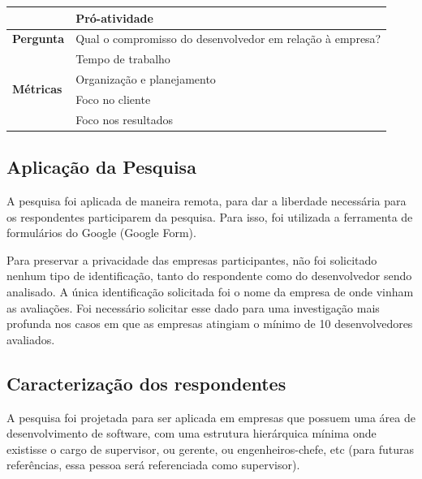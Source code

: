 \begin{table}[h]
\begin{tabular}{|p{2cm}|p{6.25cm}|p{6.25cm}|}
		& \multicolumn{2}{l|}{Pró-atividade}                                                                      \\ \hline\hline
		\textbf{Pergunta}                  & \multicolumn{2}{l|}{\parbox{12cm}{Qual o compromisso do desenvolvedor em relação à empresa?}}                          \\ \hline
		\multirow{4}{*}{\textbf{Métricas}} & \multicolumn{2}{l|}{Tempo de trabalho}                                                                  \\ \cline{2-3} 
		& \multicolumn{2}{l|}{Organização e planejamento}                                                         \\ \cline{2-3} 
		& \multicolumn{2}{l|}{Foco no cliente}                                                                    \\ \cline{2-3} 
		& \multicolumn{2}{l|}{Foco nos resultados}                                                                \\ \hline
	\end{tabular}
\end{table}

\subsection{Aplicação da Pesquisa}

A pesquisa foi aplicada de maneira remota, para dar a liberdade necessária para os respondentes participarem da pesquisa. Para isso, foi utilizada a ferramenta de formulários do Google (Google Form).

Para preservar a privacidade das empresas participantes, não foi solicitado nenhum tipo de identificação, tanto do respondente como do desenvolvedor sendo analisado. A única identificação solicitada foi o nome da empresa de onde vinham as avaliações. Foi necessário solicitar esse dado para uma investigação mais profunda nos casos em que as empresas atingiam o mínimo de 10 desenvolvedores avaliados.

\subsection{Caracterização dos respondentes}\label{caracterizacao_respondentes}

A pesquisa foi projetada para ser aplicada em empresas que possuem uma área de desenvolvimento de software, com uma estrutura hierárquica mínima onde existisse o cargo de supervisor, ou gerente, ou engenheiros-chefe, etc (para futuras referências, essa pessoa será referenciada como supervisor).

